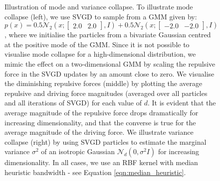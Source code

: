 \begin{figure}[h!]
	\centering
	\caption{\label{fig:mode_variance_collapse} Illustration of mode and variance collapse. To illustrate mode collapse (left), we use SVGD to sample from a GMM given by: $p(x) = 0.5 \mathcal{N}_2(x; \begin{bmatrix}2.0 & 2.0 \end{bmatrix}, I) + 0.5 \mathcal{N}_2(x; \begin{bmatrix}-2.0 & -2.0 \end{bmatrix}, I)$, where we initialise the particles from a bivariate Gaussian centred at the positive mode of the GMM. Since it is not possible to visualise mode collapse for a high-dimensional distribution, we mimic the effect on a two-dimensional GMM by scaling the repulsive force in the SVGD updates by an amount close to zero. We visualise the diminishing repulsive forces (middle) by plotting the average repulsive and driving force magnitudes (averaged over all particles and all iterations of SVGD) for each value of $d$. It is evident that the average magnitude of the repulsive force drops dramatically for increasing dimensionality, and that the converse is true for the average magnitude of the driving force. We illustrate variance collapse (right) by using SVGD particles to estimate the marginal variance $\sigma^2$ of an isotropic Gaussian $\mathcal{N}_d(0,\sigma^2 I)$ for increasing dimensionality. In all cases, we use an RBF kernel with median heuristic bandwidth - see Equation \ref{eqn:median_heuristic}.}
\end{figure}



